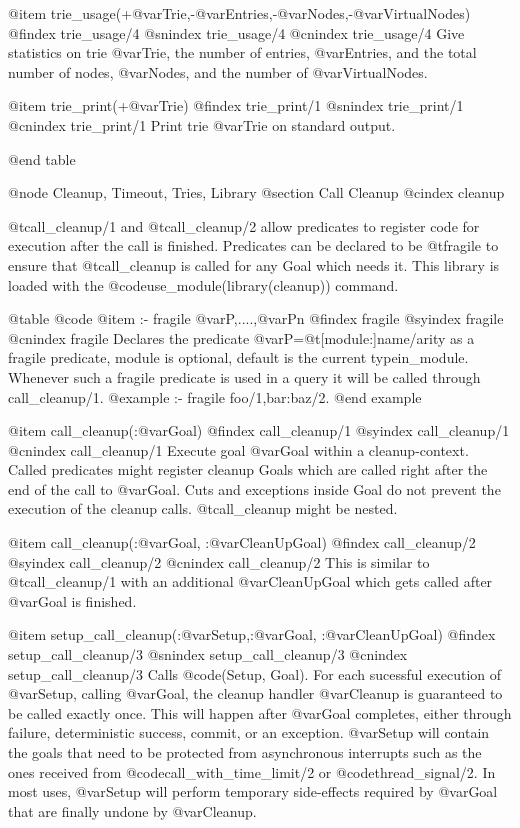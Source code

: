 {{{{{{{{@item trie_usage(+@var{Trie},-@var{Entries},-@var{Nodes},-@var{VirtualNodes})
@findex trie_usage/4
@snindex trie_usage/4
@cnindex trie_usage/4
Give statistics on trie @var{Trie}, the number of entries,
@var{Entries}, and the total number of nodes, @var{Nodes}, and the
number of @var{VirtualNodes}.

@item trie_print(+@var{Trie})
@findex trie_print/1
@snindex trie_print/1
@cnindex trie_print/1
Print trie @var{Trie} on standard output.




@end table


@node Cleanup, Timeout, Tries, Library
@section Call Cleanup
@cindex cleanup

@t{call_cleanup/1} and @t{call_cleanup/2} allow predicates to register
code for execution after the call is finished. Predicates can be
declared to be @t{fragile} to ensure that @t{call_cleanup} is called
for any Goal which needs it. This library is loaded with the
@code{use_module(library(cleanup))} command.

@table @code
@item :- fragile @var{P},....,@var{Pn}
@findex fragile
@syindex fragile
@cnindex fragile
Declares the predicate @var{P}=@t{[module:]name/arity} as a fragile
predicate, module is optional, default is the current
typein_module. Whenever such a fragile predicate is used in a query
it will be called through call_cleanup/1.
@example
:- fragile foo/1,bar:baz/2.
@end example

@item call_cleanup(:@var{Goal})
@findex call_cleanup/1
@syindex call_cleanup/1
@cnindex call_cleanup/1
Execute goal @var{Goal} within a cleanup-context. Called predicates
might register cleanup Goals which are called right after the end of
the call to @var{Goal}. Cuts and exceptions inside Goal do not prevent the
execution of the cleanup calls. @t{call_cleanup} might be nested.

@item call_cleanup(:@var{Goal}, :@var{CleanUpGoal})
@findex call_cleanup/2
@syindex call_cleanup/2
@cnindex call_cleanup/2
This is similar to @t{call_cleanup/1} with an additional
@var{CleanUpGoal} which gets called after @var{Goal} is finished.

@item setup_call_cleanup(:@var{Setup},:@var{Goal}, :@var{CleanUpGoal})
@findex setup_call_cleanup/3
@snindex setup_call_cleanup/3
@cnindex setup_call_cleanup/3
Calls @code{(Setup, Goal)}. For each sucessful execution of @var{Setup}, calling @var{Goal}, the
cleanup handler @var{Cleanup} is guaranteed to be called exactly once.
This will happen after @var{Goal} completes, either through failure,
deterministic success, commit, or an exception.  @var{Setup} will
contain the goals that need to be protected from asynchronous interrupts
such as the ones received from @code{call_with_time_limit/2} or @code{thread_signal/2}.  In
most uses, @var{Setup} will perform temporary side-effects required by
@var{Goal} that are finally undone by @var{Cleanup}.

}}}}}}}}
